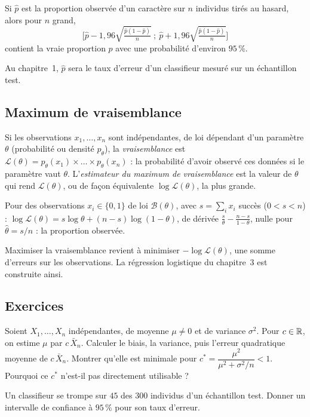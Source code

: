\begin{proposition}
\label{prop:ic}
Si $\hat p$ est la proportion observée d'un caractère sur $n$ individus tirés au hasard, alors pour $n$ grand,
\[
  \Big[\hat p-1{,}96\sqrt{\tfrac{\hat p(1-\hat p)}{n}}\ ;\ \hat p+1{,}96\sqrt{\tfrac{\hat p(1-\hat p)}{n}}\Big]
\]
contient la vraie proportion $p$ avec une probabilité d'environ $95\,\%$.
\end{proposition}
Au chapitre~1, $\hat p$ sera le taux d'erreur d'un classifieur mesuré sur un échantillon test.

\subsection{Maximum de vraisemblance}

\begin{definition}
Si les observations $x_1,\dots,x_n$ sont indépendantes, de loi dépendant d'un paramètre $\theta$ (probabilité ou densité $p_\theta$), la \emph{vraisemblance} est
$\mathcal L(\theta)=p_\theta(x_1)\times\dots\times p_\theta(x_n)$ : la probabilité d'avoir observé ces données si le paramètre vaut $\theta$.
L'\emph{estimateur du maximum de vraisemblance} est la valeur de $\theta$ qui rend $\mathcal L(\theta)$, ou de façon équivalente $\log\mathcal L(\theta)$, la plus grande.
\end{definition}

\begin{exemple}[Proportion]
Pour des observations $x_i\in\{0,1\}$ de loi $\mathcal B(\theta)$, avec $s=\sum_ix_i$ succès ($0<s<n$) :
$\log\mathcal L(\theta)=s\log\theta+(n-s)\log(1-\theta)$, de dérivée $\frac s\theta-\frac{n-s}{1-\theta}$, nulle pour $\hat\theta=s/n$ : la proportion observée.
\end{exemple}

\begin{remarque}
Maximiser la vraisemblance revient à minimiser $-\log\mathcal L(\theta)$, une somme d'erreurs sur les observations. La régression logistique du chapitre~3 est construite ainsi.
\end{remarque}

\subsection*{Exercices}

\begin{exercice}
\label{ex:shrinkage}
Soient $X_1,\dots,X_n$ indépendantes, de moyenne $\mu\ne0$ et de variance $\sigma^2$. Pour $c\in\mathbb{R}$, on estime $\mu$ par $c\,\bar X_n$.
Calculer le biais, la variance, puis l'erreur quadratique moyenne de $c\,\bar X_n$. Montrer qu'elle est minimale pour $c^*=\dfrac{\mu^2}{\mu^2+\sigma^2/n}<1$.
Pourquoi ce $c^*$ n'est-il pas directement utilisable ?
\end{exercice}

\begin{exercice}
\label{ex:ic}
Un classifieur se trompe sur $45$ des $300$ individus d'un échantillon test. Donner un intervalle de confiance à $95\,\%$ pour son taux d'erreur.
\end{exercice}
